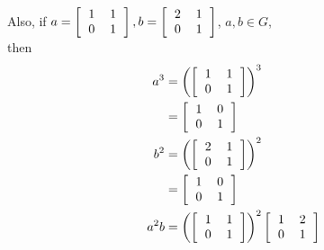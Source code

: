 \documentclass[paper=usletter, fontsize=12pt]{article}
\begin{document}
\begin{itemize}
\begin{itemize}
\begin{cproof}
                Also, if $a=\left[\begin{tabular}{cc}
                            1 & 1 \\
                            0 & 1
                    \end{tabular}\right], b=\left[\begin{tabular}{cc}
                            2 & 1 \\
                            0 & 1
                    \end{tabular}\right]$, $a,b \in G$,\\
                then
                \begin{align*}
                    a^3 & = \left(\left[\begin{tabular}{cc}
                            1 & 1 \\
                            0 & 1
                    \end{tabular}\right]\right)^3\\
                    & = \left[\begin{tabular}{cc}
                            1 & 0 \\
                            0 & 1
                    \end{tabular}\right]\\
                    b^2 & = \left(\left[\begin{tabular}{cc}
                            2 & 1 \\
                            0 & 1
                    \end{tabular}\right]\right)^2\\
                    & = \left[\begin{tabular}{cc}
                            1 & 0 \\
                            0 & 1
                    \end{tabular}\right]\\
                    a^2b & = \left(\left[\begin{tabular}{cc}
                            1 & 1 \\
                            0 & 1
                    \end{tabular}\right]\right)^2\left[\begin{tabular}{cc}
                            1 & 2 \\
                            0 & 1
                    \end{tabular}\right]\\

\end{align*}
\end{cproof}
\end{itemize}
\end{itemize}
\end{document}
